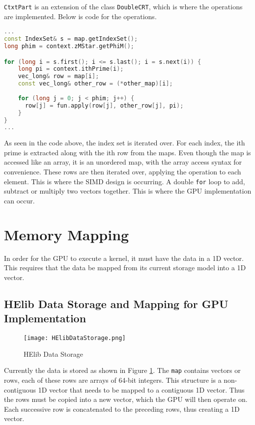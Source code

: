 \verb|CtxtPart| is an extension of the class \verb|DoubleCRT|, which is where the operations are implemented. Below is code for the operations.

\begin{lstlisting}[language=C++,caption={Add, Sub and Mul operations of two DoubleCRT objects}]
...
const IndexSet& s = map.getIndexSet();
long phim = context.zMStar.getPhiM();

for (long i = s.first(); i <= s.last(); i = s.next(i)) {
    long pi = context.ithPrime(i);
    vec_long& row = map[i];
    const vec_long& other_row = (*other_map)[i];
    
    for (long j = 0; j < phim; j++) {
      row[j] = fun.apply(row[j], other_row[j], pi);
    }
}
...
\end{lstlisting}

As seen in the code above, the index set is iterated over. For each index, the ith prime is extracted along with the ith row from the maps. Even though the map is accessed like an array, it is an unordered map, with the array access syntax for convenience. These rows are then iterated over, applying the operation to each element. This is where the SIMD design is occurring. A double \verb|for| loop to add, subtract or multiply two vectors together. This is where the GPU implementation can occur.

\section{Memory Mapping} \label{sec:MemoryMapping}
In order for the GPU to execute a kernel, it must have the data in a 1D vector. This requires that the data be mapped from its current storage model into a 1D vector.

\subsection{HElib Data Storage and Mapping for GPU Implementation}

\begin{figure}[htp]
\centering
\texttt{[image: HElibDataStorage.png]}
\caption{HElib Data Storage}
\label{fig:HElibDataStorage}
\end{figure}

Currently the data is stored as shown in Figure \ref{fig:HElibDataStorage}. The \verb|map| contains vectors or rows, each of these rows are arrays of 64-bit integers. This structure is a non-contiguous 1D vector that needs to be mapped to a contiguous 1D vector. Thus the rows must be copied into a new vector, which the GPU will then operate on. Each successive row is concatenated to the preceding rows, thus creating a 1D vector.

